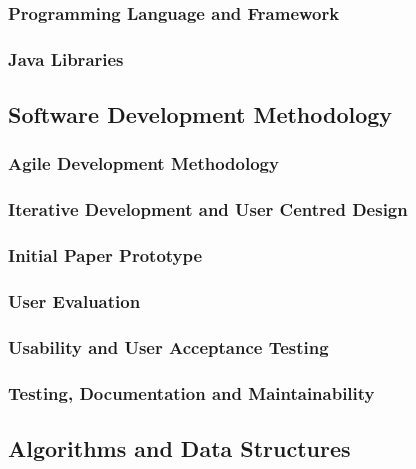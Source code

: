 \subsubsection{Programming Language and Framework}
\subsubsection{Java Libraries}
\subsection{Software Development Methodology}\label{subsec:software-development-methodology}
\subsubsection{Agile Development Methodology}
\subsubsection{Iterative Development and User Centred Design}
\subsubsection{Initial Paper Prototype}
\subsubsection{User Evaluation}
\subsubsection{Usability and User Acceptance Testing}
\subsubsection{Testing, Documentation and Maintainability}
\subsection{Algorithms and Data Structures}\label{subsec:algorithms-and-data-structures}
